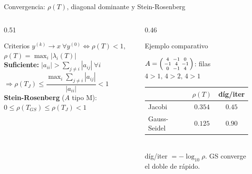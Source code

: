 \documentclass[aspectratio=169,10pt]{beamer}
\begin{document}
\begin{frame}{Convergencia: $\rho(T)$, diagonal dominante y Stein-Rosenberg}
\begin{columns}[T]
\begin{column}{0.51\textwidth}
\begin{cardidea}{Criterios}{\faSuperscript}
{\footnotesize $y^{(k)}\to x\ \forall y^{(0)}\iff \rho(T)<1$,\ \ $\rho(T)=\max_i|\lambda_i(T)|$\\[1.4mm]
\textbf{Suficiente:} $|a_{ii}|>\sum_{j\neq i}|a_{ij}|\ \forall i$\\[0.4mm]
$\Rightarrow\rho(T_J)\le \dfrac{\max_i\sum_{j\neq i}|a_{ij}|}{|a_{ii}|}<1$\\[1.4mm]
\textbf{Stein-Rosenberg} ($A$ tipo M): $0\le\rho(T_{GS})\le\rho(T_J)<1$}
\end{cardidea}
\end{column}
\begin{column}{0.46\textwidth}
\begin{cardgear}{Ejemplo comparativo}{\faCalculator}
{\footnotesize $A=\begin{psmallmatrix}4&-1&0\\-1&4&-1\\0&-1&4\end{psmallmatrix}$: filas $4>1,\,4>2,\,4>1$ \checkmark\\[1mm]
\renewcommand{\arraystretch}{1.2}
\begin{tabular}{l|cc}
& $\rho(T)$ & díg/iter\\\hline
Jacobi & $0.354$ & $0.45$\\
Gauss-Seidel & $0.125$ & $0.90$\\
\end{tabular}\\[1mm]
díg/iter $=-\log_{10}\rho$. GS converge el doble de rápido.}
\end{cardgear}
\end{column}
\end{columns}
\end{frame}
\end{document}
